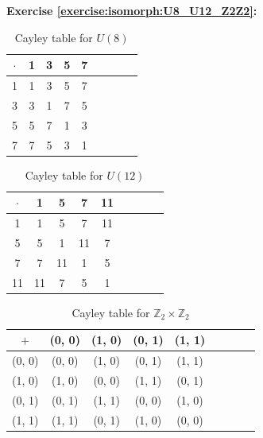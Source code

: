 \noindent\textbf{Exercise \ref{exercise:isomorph:U8_U12_Z2Z2}:}
\begin{multicols}{3}
\begin{table}[H]
\caption{Cayley table for $U(8)$}
{\small
\begin{center}
\begin{tabular}{c|cccccccc}
$\cdot$ & 1 & 3 & 5 & 7  \\
\hline
1        & 1 & 3 & 5 & 7  \\
3       & 3 & 1 & 7 & 5  \\
5       & 5 & 7 & 1 & 3 \\
7       & 7 & 5 & 3 & 1 \\
\end{tabular}
\end{center}
}
\end{table}

\begin{table}[H]
\caption{Cayley table for $U(12)$}
{\small
\begin{center}
\begin{tabular}{c|cccccccc}
$\cdot$ & 1 & 5 & 7 & 11  \\
\hline
1        & 1 & 5 & 7 & 11  \\
5       & 5 & 1 & 11 & 7 \\
7       & 7 & 11 & 1 & 5  \\
11      & 11 & 7 & 5 & 1 \\
\end{tabular}
\end{center}
}
\end{table}

\begin{table}[H]
\caption{Cayley table for ${\mathbb Z}_2 \times {\mathbb Z}_2$}
{\small
\begin{center}
\begin{tabular}{c|cccccccc}
$+$ & (0, 0) & (1, 0) & (0, 1) & (1, 1)  \\
\hline
(0, 0)        & (0, 0) & (1, 0) & (0, 1) & (1, 1)  \\
(1, 0)       & (1, 0) & (0, 0) & (1, 1) & (0, 1)  \\
(0, 1)       & (0, 1) & (1, 1) & (0, 0) & (1, 0) \\
(1, 1)       & (1, 1) & (0, 1) & (1, 0) & (0, 0) \\
\end{tabular}
\end{center}
}
\end{table}
\end{multicols}
